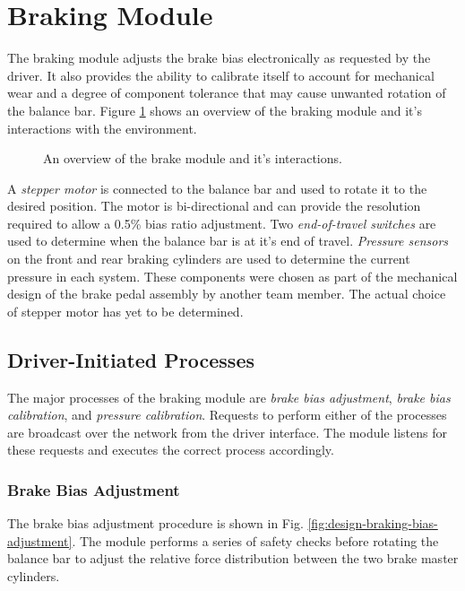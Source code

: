 \section{Braking Module\label{sec:Braking-Module-Design}}

The braking module adjusts the brake bias electronically as requested by the driver. It also provides the ability to calibrate itself to account for mechanical wear and a degree of component tolerance that may cause unwanted rotation of the balance bar. Figure \ref{fig:design_brake_overview_block} shows an overview of the braking module and it's interactions with the environment. 

\begin{figure}[H]
\centering

\caption{An overview of the brake module and it's interactions.}
\label{fig:design_brake_overview_block}
\end{figure}

A \emph{stepper motor} is connected to the balance bar and used to rotate it to the desired position. The motor is bi-directional and can provide the resolution required to allow a 0.5\% bias ratio adjustment. Two \emph{end-of-travel switches} are used to determine when the balance bar is at it's end of travel. \emph{Pressure sensors} on the front and rear braking cylinders are used to determine the current pressure in each system. These components were chosen as part of the mechanical design of the brake pedal assembly by another team member. The actual choice of stepper motor has yet to be determined.

\subsection{Driver-Initiated Processes \label{sec:braking_processes}}

The major processes of the braking module are \emph{brake bias adjustment}, \emph{brake bias calibration}, and \emph{pressure calibration}. Requests to perform either of the processes are broadcast over the network from the driver interface. The module listens for these requests and executes the correct process accordingly. 

\subsubsection{Brake Bias Adjustment}

The brake bias adjustment procedure is shown in Fig. \ref{fig:design-braking-bias-adjustment}. The module performs a series of safety checks before rotating the balance bar to adjust the relative force distribution between the two brake master cylinders.

